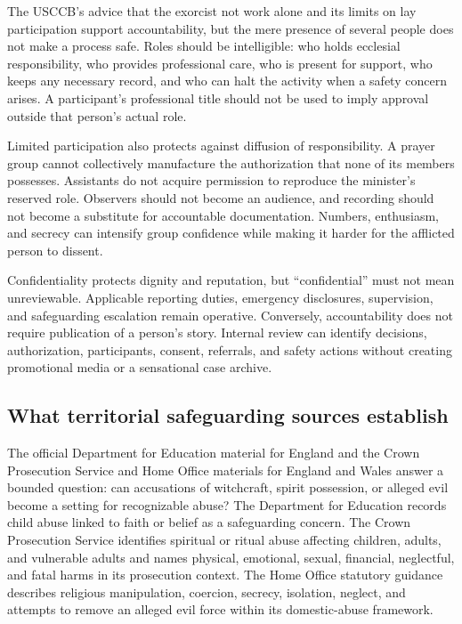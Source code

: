 The USCCB's advice that the exorcist not work alone and its limits on lay
participation support accountability, but the mere presence of several people
does not make a process safe. Roles should be intelligible: who holds
ecclesial responsibility, who provides professional care, who is present for
support, who keeps any necessary record, and who can halt the activity when a
safety concern arises. A participant's professional title should not be used
to imply approval outside that person's actual role.

Limited participation also protects against diffusion of responsibility. A
prayer group cannot collectively manufacture the authorization that none of
its members possesses. Assistants do not acquire permission to reproduce the
minister's reserved role. Observers should not become an audience, and
recording should not become a substitute for accountable documentation.
Numbers, enthusiasm, and secrecy can intensify group confidence while making
it harder for the afflicted person to dissent.

Confidentiality protects dignity and reputation, but ``confidential'' must not
mean unreviewable. Applicable reporting duties, emergency disclosures,
supervision, and safeguarding escalation remain operative. Conversely,
accountability does not require publication of a person's story. Internal
review can identify decisions, authorization, participants, consent, referrals,
and safety actions without creating promotional media or a sensational case
archive.

\subsection{What territorial safeguarding sources establish}

The official Department for Education material for England and the Crown
Prosecution Service and Home Office materials for England and Wales answer a
bounded question:
can accusations of witchcraft, spirit possession, or alleged evil become a
setting for recognizable abuse? The Department for Education records child
abuse linked to faith or belief as a safeguarding concern. The Crown
Prosecution Service identifies spiritual or ritual abuse affecting children,
adults, and vulnerable adults and names physical, emotional, sexual,
financial, neglectful, and fatal harms in its prosecution context. The Home
Office statutory guidance describes religious manipulation, coercion,
secrecy, isolation, neglect, and attempts to remove an alleged evil force
within its domestic-abuse framework.

